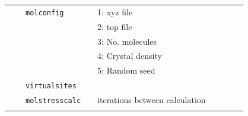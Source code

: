 \documentclass[11pt]{article}
\begin{document}
\begin{center}
\begin{tabular}{cclclcccc}
    $\mbox{}$ && \verb!molconfig!&& 1: \textsf{xyz} file && \\
              &&                 && 2: \textsf{top} file && \\
              &&                 && 3: No. molecules && \\
              &&                 && 4: Crystal density && \\
              &&                 && 5: Random seed && \\
              &&\verb!virtualsites!&& && \\
    $\mbox{}$ &&\verb!molstresscalc! && iterations between calculation && \\ 
    && && && \\
    \hline                                           
  \end{tabular}

\end{center}
\end{document}
